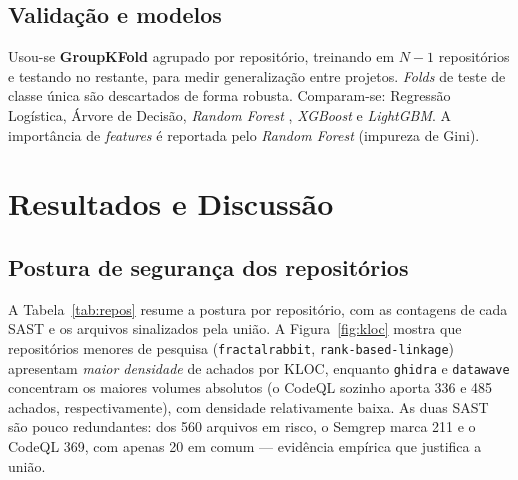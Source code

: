 \documentclass[12pt]{article}
\begin{document}
\subsection{Validação e modelos}
Usou-se \textbf{GroupKFold} agrupado por repositório, treinando em $N-1$
repositórios e testando no restante, para medir generalização entre projetos.
\textit{Folds} de teste de classe única são descartados de forma robusta.
Comparam-se: Regressão Logística, Árvore de Decisão, \textit{Random Forest}
\cite{breiman2001}, \textit{XGBoost} \cite{xgboost2016} e \textit{LightGBM}. A
importância de \textit{features} é reportada pelo \textit{Random Forest}
(impureza de Gini).

\section{Resultados e Discussão}

\subsection{Postura de segurança dos repositórios}
A Tabela~\ref{tab:repos} resume a postura por repositório, com as contagens de
cada SAST e os arquivos sinalizados pela união. A Figura~\ref{fig:kloc} mostra
que repositórios menores de pesquisa (\texttt{fractalrabbit},
\texttt{rank-based-linkage}) apresentam \emph{maior densidade} de achados por
KLOC, enquanto \texttt{ghidra} e \texttt{datawave} concentram os maiores volumes
absolutos (o CodeQL sozinho aporta 336 e 485 achados, respectivamente), com
densidade relativamente baixa. As duas SAST são pouco redundantes: dos 560
arquivos em risco, o Semgrep marca 211 e o CodeQL 369, com apenas 20 em comum
--- evidência empírica que justifica a união.
\end{document}
